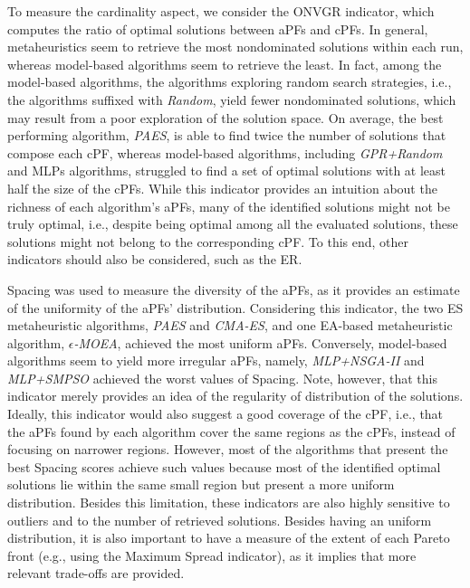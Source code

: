 To measure the cardinality aspect, we consider the \ac{ONVGR} indicator, which computes the ratio of optimal solutions between \acp{aPF} and \acp{cPF}. In general, metaheuristics seem to retrieve the most nondominated solutions within each run, whereas model-based algorithms seem to retrieve the least. In fact, among the model-based algorithms, the algorithms exploring random search strategies, i.e., the algorithms suffixed with \textit{Random}, yield fewer nondominated solutions, which may result from a poor exploration of the solution space. On average, the best performing algorithm, \textit{PAES}, is able to find twice the number of solutions that compose each \ac{cPF}, whereas model-based algorithms, including \textit{GPR+Random} and \acp{MLP} algorithms, struggled to find a set of optimal solutions with at least half the size of the \acp{cPF}. While this indicator provides an intuition about the richness of each algorithm's \acp{aPF}, many of the identified solutions might not be truly optimal, i.e., despite being optimal among all the evaluated solutions, these solutions might not belong to the corresponding \ac{cPF}. To this end, other indicators should also be considered, such as the \ac{ER}.

Spacing was used to measure the diversity of the \acp{aPF}, as it provides an estimate of the uniformity of the \acp{aPF}' distribution. Considering this indicator, the two \ac{ES} metaheuristic algorithms, \textit{PAES} and \textit{CMA-ES}, and one \ac{EA}-based metaheuristic algorithm, $\epsilon$\textit{-MOEA}, achieved the most uniform \acp{aPF}. Conversely, model-based algorithms seem to yield more irregular \acp{aPF}, namely, \textit{MLP+NSGA-II} and \textit{MLP+SMPSO} achieved the worst values of Spacing. Note, however, that this indicator merely provides an idea of the regularity of distribution of the solutions. Ideally, this indicator would also suggest a good coverage of the \ac{cPF}, i.e., that the \acp{aPF} found by each algorithm cover the same regions as the \acp{cPF}, instead of focusing on narrower regions. However, most of the algorithms that present the best Spacing scores achieve such values because most of the identified optimal solutions lie within the same small region but present a more uniform distribution. Besides this limitation, these indicators are also highly sensitive to outliers and to the number of retrieved solutions. Besides having an uniform distribution, it is also important to have a measure of the extent of each Pareto front (e.g., using the Maximum Spread indicator), as it implies that more relevant trade-offs are provided.

